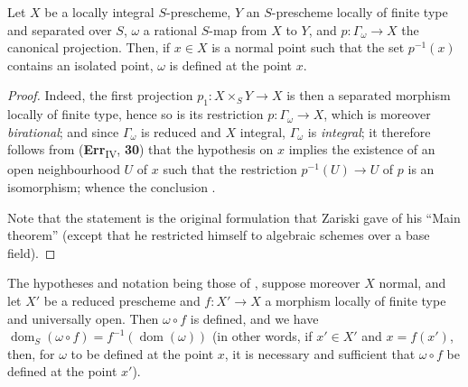 \begin{proposition}[20.4.4]
\label{IV.20.4.4}
Let $X$ be a locally integral $S$-prescheme, $Y$ an $S$-prescheme locally of finite type and separated over $S$, $\omega$ a rational $S$-map from $X$ to $Y$, and $p:\Gamma_\omega\to X$ the canonical projection.
Then, if $x\in X$ is a \textup{normal} point such that the set $p^{-1}(x)$ contains an \textup{isolated} point, $\omega$ is defined at the point $x$.
\end{proposition}

\begin{proof}
Indeed, the first projection $p_1:X\times_S Y\to X$ is then a separated morphism locally of finite type, hence so is its restriction $p:\Gamma_\omega\to X$, which is moreover \emph{birational}; and since $\Gamma_\omega$ is reduced and $X$ integral, $\Gamma_\omega$ is \emph{integral}; it therefore follows from (\textbf{Err}\textsubscript{IV}, \textbf{30}) that the hypothesis on $x$ implies the existence of an open neighbourhood $U$ of $x$ such that the restriction $p^{-1}(U)\to U$ of $p$ is an isomorphism; whence the conclusion .

Note that the statement  is the original formulation that Zariski gave of his ``Main theorem'' (except that he restricted himself to algebraic schemes over a base field).
\end{proof}

\begin{proposition}[20.4.5]
\label{IV.20.4.5}
The hypotheses and notation being those of , suppose moreover $X$ normal, and let $X'$ be a \textup{reduced} prescheme and $f:X'\to X$ a morphism locally of finite type and \textup{universally open}.
Then $\omega\circ f$ is defined, and we have $\operatorname{dom}_S(\omega\circ f)=f^{-1}(\operatorname{dom}(\omega))$ \textup{(in other words, if $x'\in X'$ and $x=f(x')$, then, for $\omega$ to be defined at the point $x$, it is necessary and sufficient that $\omega\circ f$ be defined at the point $x'$)}.
\end{proposition}

